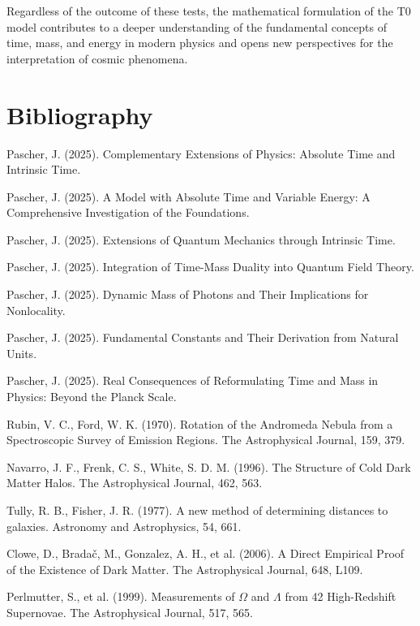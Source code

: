 \documentclass[a4paper,12pt]{article}
\begin{document}
	Regardless of the outcome of these tests, the mathematical formulation of the T0 model contributes to a deeper understanding of the fundamental concepts of time, mass, and energy in modern physics and opens new perspectives for the interpretation of cosmic phenomena.
	
	\section{Bibliography}
	
	\begin{thebibliography}{99}
		
		 Pascher, J. (2025). Complementary Extensions of Physics: Absolute Time and Intrinsic Time.
		
		 Pascher, J. (2025). A Model with Absolute Time and Variable Energy: A Comprehensive Investigation of the Foundations.
		
		 Pascher, J. (2025). Extensions of Quantum Mechanics through Intrinsic Time.
		
		 Pascher, J. (2025). Integration of Time-Mass Duality into Quantum Field Theory.
		
		 Pascher, J. (2025). Dynamic Mass of Photons and Their Implications for Nonlocality.
		
		 Pascher, J. (2025). Fundamental Constants and Their Derivation from Natural Units.
		
		 Pascher, J. (2025). Real Consequences of Reformulating Time and Mass in Physics: Beyond the Planck Scale.
		
		 Rubin, V. C., Ford, W. K. (1970). Rotation of the Andromeda Nebula from a Spectroscopic Survey of Emission Regions. The Astrophysical Journal, 159, 379.
		
		 Navarro, J. F., Frenk, C. S., White, S. D. M. (1996). The Structure of Cold Dark Matter Halos. The Astrophysical Journal, 462, 563.
		
		 Tully, R. B., Fisher, J. R. (1977). A new method of determining distances to galaxies. Astronomy and Astrophysics, 54, 661.
		
		 Clowe, D., Bradač, M., Gonzalez, A. H., et al. (2006). A Direct Empirical Proof of the Existence of Dark Matter. The Astrophysical Journal, 648, L109.
		
		 Perlmutter, S., et al. (1999). Measurements of $\Omega$ and $\Lambda$ from 42 High-Redshift Supernovae. The Astrophysical Journal, 517, 565.
		

\end{thebibliography}
\end{document}
